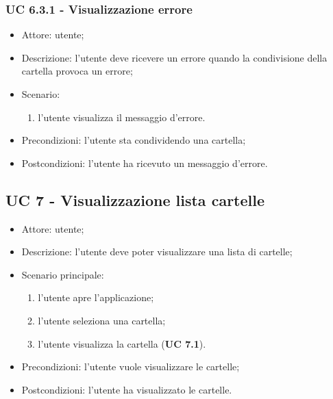     \subsubsection{UC 6.3.1 - Visualizzazione errore }
    \begin{itemize}
        \item Attore: utente;
        \item Descrizione: l'utente deve ricevere un errore quando la condivisione della cartella provoca un errore;
        \item Scenario:
        \begin{enumerate}
        \item l'utente visualizza il messaggio d'errore.
        \end{enumerate}   
        \item Precondizioni: l'utente sta condividendo una cartella;
        \item Postcondizioni: l'utente ha ricevuto un messaggio d'errore.
    \end{itemize}

    \subsection{UC 7 - Visualizzazione lista cartelle}
    \begin{itemize}
        \item Attore: utente;
        \item Descrizione: l'utente deve poter visualizzare una lista di cartelle;
        \item Scenario principale:
            \begin{enumerate}
            \item l'utente apre l'applicazione;
            \item l'utente seleziona una cartella;
            \item l'utente visualizza la cartella (\textbf{UC 7.1}).
            \end{enumerate}
        \item Precondizioni: l'utente vuole visualizzare le cartelle;
        \item Postcondizioni: l'utente ha visualizzato le cartelle.
    \end{itemize}
